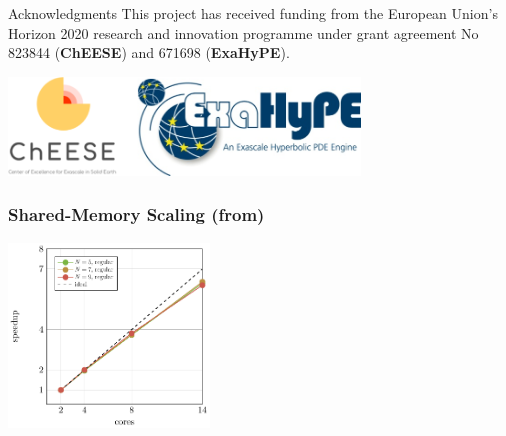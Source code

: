 \documentclass[aspectratio=169]{beamer}
\begin{document}
\begin{frame}{Acknowledgments}
This project has received funding from the European Union's Horizon 2020 research and
innovation programme under grant agreement No 823844 (\textbf{ChEESE}) and 671698 (\textbf{ExaHyPE}).

\begin{center}
\includegraphics[width=0.7\textwidth]{logos}
\end{center}
\end{frame}

\begin{frame}
  \frametitle{Shared-Memory Scaling (from)}

  \begin{center}
  \includegraphics[width=0.4\textwidth]{speedup_tbb}
  \end{center}
  
\end{frame}
\end{document}

